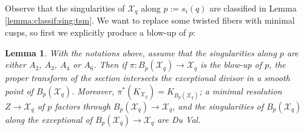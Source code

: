 \documentclass[11pt]{amsart}
\newcommand{\sX}{\mathscr{X}}
\newtheorem{Lemma}[theorem]{Lemma}
\theoremstyle{definition}
\begin{document}
Observe that the singularities of $\sX_q$ along $p:=s_i(q)$ are classified in Lemma \ref{lemma:classif:sing:tsm}. We want to replace
some twisted fibers with minimal cusps, so first
we explicitly produce a blow-up of $p$:

\begin{Lemma}\label{Lemma:sing:duval:fibers}
With the notations above, assume that the singularities along $p$ are either
$A_2$, $A_3$, $A_4$ or $A_6$.
Then if $\pi:B_p(\sX_q) \to \sX_q$ is the blow-up of $p$, the proper transform of the section intersects the exceptional divisor in a smooth point of
$B_p(\sX_q)$. Moreover, $\pi^*(K_{\sX_q})=K_{B_p(\sX_q)}$; a minimal resolution $Z \to \sX_q$ of $p$ factors through $ B_p(\sX_q) \to \sX_q$, and the singularities of $B_p(\sX_q)$ along the exceptional of $B_p(\sX_q) \to \sX_q$ are Du Val. \end{Lemma}
\end{document}
